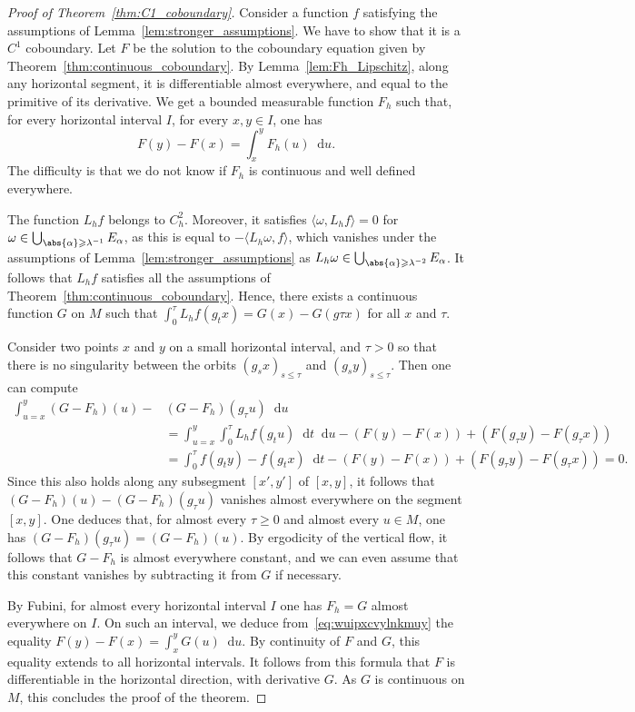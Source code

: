 \documentclass[11pt, a4paper, oneside, final, pagebackref]{amsart}
\newcommand{\dd}{\mathop{}\!\mathrm{d}}
\renewcommand{\leq}{\leqslant}
\renewcommand{\geq}{\geqslant}
\theoremstyle{definition}
\numberwithin{equation}{section}
\begin{document}
\begin{proof}[Proof of Theorem~\ref{thm:C1_coboundary}]
Consider a function $f$ satisfying the assumptions of
Lemma~\ref{lem:stronger_assumptions}. We have to show that it is a $C^1$
coboundary. Let $F$ be the solution to the coboundary equation given by
Theorem~\ref{thm:continuous_coboundary}. By Lemma~\ref{lem:Fh_Lipschitz},
along any horizontal segment, it is differentiable almost everywhere, and
equal to the primitive of its derivative. We get a bounded measurable
function $F_h$ such that, for every horizontal interval $I$, for every $x,
y\in I$, one has
\begin{equation}
\label{eq:wuipxcvylnkmuy}
  F(y)-F(x) = \int_x^y F_h(u) \dd u.
\end{equation}
The difficulty is that we do not know if $F_h$ is continuous and well defined
everywhere.

The function $L_h f$ belongs to $C^2_h$. Moreover, it satisfies $\langle
\omega, L_h f\rangle = 0$ for $\omega \in \bigcup_{\abs{\alpha} \geq
\lambda^{-1}} E_\alpha$, as this is equal to $-\langle L_h \omega, f\rangle$,
which vanishes under the assumptions of Lemma~\ref{lem:stronger_assumptions}
as $L_h \omega \in \bigcup_{\abs{\alpha} \geq \lambda^{-2}} E_\alpha$. It
follows that $L_h f$ satisfies all the assumptions of
Theorem~\ref{thm:continuous_coboundary}. Hence, there exists a continuous
function $G$ on $M$ such that $\int_0^\tau L_h f(g_t x) = G(x)-G(g\tau x)$
for all $x$ and $\tau$.

Consider two points $x$ and $y$ on a small horizontal interval, and $\tau>0$
so that there is no singularity between the orbits $(g_s x)_{s\leq \tau}$ and
$(g_s y)_{s\leq \tau}$. Then one can compute
\begin{align*}
  \int_{u=x}^y (G-F_h)(u) - &(G-F_h)(g_\tau u) \dd u
  \\&= \int_{u=x}^y \int_0^\tau L_h f(g_t u) \dd t \dd u - (F(y)-F(x)) + (F(g_\tau y) - F(g_\tau x))
  \\& = \int_0^\tau f(g_t y) - f(g_t x) \dd t - (F(y)-F(x)) + (F(g_\tau y) - F(g_\tau x))
  = 0.
\end{align*}
Since this also holds along any subsegment $[x',y']$ of $[x,y]$, it follows
that $(G-F_h)(u) - (G-F_h)(g_\tau u)$ vanishes almost everywhere on the
segment $[x,y]$. One deduces that, for almost every $\tau \geq 0$ and almost
every $u\in M$, one has $(G-F_h)(g_\tau u) = (G-F_h)(u)$. By ergodicity of
the vertical flow, it follows that $G-F_h$ is almost everywhere constant, and
we can even assume that this constant vanishes by subtracting it from $G$ if
necessary.

By Fubini, for almost every horizontal interval $I$ one has $F_h = G$ almost
everywhere on $I$. On such an interval, we deduce
from~\eqref{eq:wuipxcvylnkmuy} the equality $F(y)-F(x) = \int_x^y G(u) \dd
u$. By continuity of $F$ and $G$, this equality extends to all horizontal
intervals. It follows from this formula that $F$ is differentiable in the
horizontal direction, with derivative $G$. As $G$ is continuous on $M$, this
concludes the proof of the theorem.
\end{proof}
\end{document}
